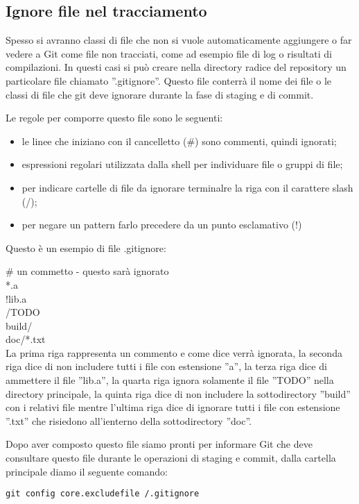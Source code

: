 \subsection{Ignore file nel tracciamento}
Spesso si avranno classi di file che non si vuole automaticamente aggiungere o far vedere a Git come file non tracciati, come ad esempio file di log o risultati di compilazioni. In questi casi si può creare nella directory radice del repository un particolare file chiamato ''.gitignore''. Questo file conterrà il nome dei file o le classi di file che git deve ignorare durante la fase di staging e di commit.

Le regole per comporre questo file sono le seguenti:

\begin{itemize}
\item le linee che iniziano con il cancelletto (\#)  sono commenti, quindi ignorati;
\item espressioni regolari utilizzata dalla shell per individuare file o gruppi di file;
\item per indicare cartelle di file da ignorare terminalre la riga con il carattere slash (/);
\item per negare un pattern farlo precedere da un punto esclamativo (!)
\end{itemize}

Questo è un esempio di file .gitignore:

\# un commetto - questo sarà ignorato\\
*.a\\
!lib.a\\
/TODO\\
build/\\
doc/*.txt\\

La prima riga rappresenta un commento e come dice verrà ignorata, la seconda riga dice di non includere tutti i file con estensione ''a'', la terza riga dice di ammettere il file ''lib.a'', la quarta riga ignora solamente il file ''TODO'' nella directory principale, la quinta riga dice di non includere la sottodirectory ''build'' con i relativi file mentre l'ultima riga dice di ignorare tutti i file con estensione ''.txt'' che risiedono all'ienterno della sottodirectory ''doc''.

Dopo aver composto questo file siamo pronti per informare Git che deve consultare questo file durante le operazioni di staging e commit, dalla cartella principale diamo il seguente comando:

\begin{center}
\texttt{git config core.excludefile /.gitignore}
\end{center}